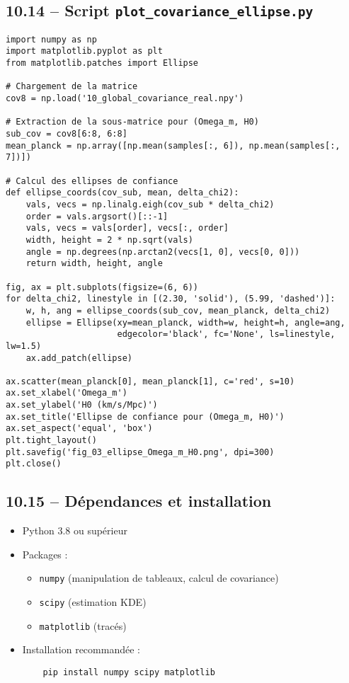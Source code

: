 \subsection{10.14 – Script \texttt{plot\_covariance\_ellipse.py}}
\begin{verbatim}
import numpy as np
import matplotlib.pyplot as plt
from matplotlib.patches import Ellipse

# Chargement de la matrice
cov8 = np.load('10_global_covariance_real.npy')

# Extraction de la sous-matrice pour (Omega_m, H0)
sub_cov = cov8[6:8, 6:8]
mean_planck = np.array([np.mean(samples[:, 6]), np.mean(samples[:, 7])])

# Calcul des ellipses de confiance
def ellipse_coords(cov_sub, mean, delta_chi2):
    vals, vecs = np.linalg.eigh(cov_sub * delta_chi2)
    order = vals.argsort()[::-1]
    vals, vecs = vals[order], vecs[:, order]
    width, height = 2 * np.sqrt(vals)
    angle = np.degrees(np.arctan2(vecs[1, 0], vecs[0, 0]))
    return width, height, angle

fig, ax = plt.subplots(figsize=(6, 6))
for delta_chi2, linestyle in [(2.30, 'solid'), (5.99, 'dashed')]:
    w, h, ang = ellipse_coords(sub_cov, mean_planck, delta_chi2)
    ellipse = Ellipse(xy=mean_planck, width=w, height=h, angle=ang,
                      edgecolor='black', fc='None', ls=linestyle, lw=1.5)
    ax.add_patch(ellipse)

ax.scatter(mean_planck[0], mean_planck[1], c='red', s=10)
ax.set_xlabel('Omega_m')
ax.set_ylabel('H0 (km/s/Mpc)')
ax.set_title('Ellipse de confiance pour (Omega_m, H0)')
ax.set_aspect('equal', 'box')
plt.tight_layout()
plt.savefig('fig_03_ellipse_Omega_m_H0.png', dpi=300)
plt.close()
\end{verbatim}

\subsection{10.15 – Dépendances et installation}
\begin{itemize}
  \item Python 3.8 ou supérieur  
  \item Packages :  
    \begin{itemize}
      \item \texttt{numpy} (manipulation de tableaux, calcul de covariance)  
      \item \texttt{scipy} (estimation KDE)  
      \item \texttt{matplotlib} (tracés)  
    \end{itemize}
  \item Installation recommandée :  
    \begin{verbatim}
    pip install numpy scipy matplotlib
    \end{verbatim}
\end{itemize}

